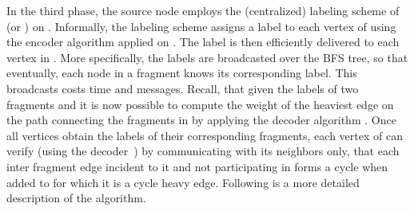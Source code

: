 \documentclass[11pt,letter]{article}
\begin{document}
In the third phase, the source node  employs the (centralized) labeling scheme  of \cite{KKKP_05} (or \cite{KK07}) on . 
Informally, the labeling scheme assigns a label  to each vertex  of  
using  the encoder algorithm  applied on . The label  is then efficiently delivered to each vertex in .
More specifically, the  labels are broadcasted over the BFS tree, so that eventually, each node in a fragment knows its corresponding label. This broadcasts costs  time and  messages.
Recall, that given the labels of two fragments  and  it is now possible to 
compute the weight of the heaviest edge on the path connecting the fragments 
in  by applying the decoder algorithm . Once all vertices obtain the labels of their corresponding fragments, each vertex of  can verify  (using the decoder~) by communicating with its neighbors only,
that each inter fragment edge incident to it and not participating in 
 forms a cycle when added to  for which it is a cycle heavy 
edge. Following is a more detailed description of the algorithm.
\end{document}
